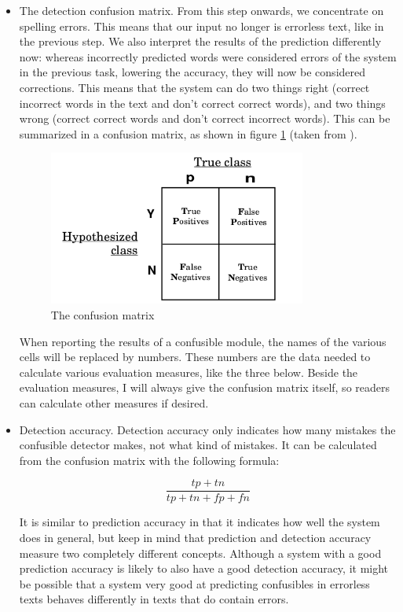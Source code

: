 \documentclass[12pt]{article}
\begin{document}
\begin{itemize}
\item The detection confusion matrix. From this step onwards, we concentrate on spelling errors. This means that our input no longer is errorless text, like in the previous step. We also interpret the results of the prediction differently now: whereas incorrectly predicted words were considered errors of the system in the previous task, lowering the accuracy, they will now be considered corrections. This means that the system can do two things right (correct incorrect words in the text and don't correct correct words), and two things wrong (correct correct words and don't correct incorrect words). This can be summarized in a confusion matrix, as shown in figure \ref{fig:confusion} (taken from \citet{fawcett04}).

\begin{figure}[htb]
\centering
\includegraphics[width=0.8\textwidth]{confusion_matrix.png}
\caption{The confusion matrix}
\label{fig:confusion}
\end{figure}

When reporting the results of a confusible module, the names of the various cells will be replaced by numbers. These numbers are the data needed to calculate various evaluation measures, like the three below. Beside the evaluation measures, I will always give the confusion matrix itself, so readers can calculate other measures if desired.

\item Detection accuracy. Detection accuracy only indicates how many mistakes the confusible detector makes, not what kind of mistakes. It can be calculated from the confusion matrix with the following formula:

\[
\frac{tp+tn}{tp+tn+fp+fn}
\]

It is similar to prediction accuracy in that it indicates how well the system does in general, but keep in mind that prediction and detection accuracy measure two completely different concepts. Although a system with a good prediction accuracy is likely to also have a good detection accuracy, it might be possible that a system very good at predicting confusibles in errorless texts behaves differently in texts that do contain errors.
 

\end{itemize}
\end{document}

